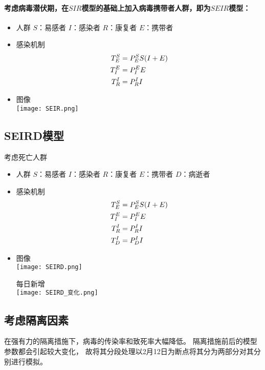 \paragraph{考虑病毒潜伏期，在$SIR$模型的基础上加入病毒携带者人群，即为$SEIR$模型：}
\begin{itemize}
    \item 人群
          \subitem $S$：易感者
          \subitem $I$：感染者
          \subitem $R$：康复者
          \subitem $E$：携带者
    \item 感染机制
          \subitem
          \begin{align}
              T^{S}_{E}&=P^{S}_{E}S(I+E) \\
              T^{E}_{I}&=P^{E}_{I}E      \\
              T^{I}_{R}&=P^{I}_{R}I
          \end{align}
    \item 图像
          \\
          \texttt{[image: SEIR.png]}
\end{itemize}
\subsection{SEIRD模型}
考虑死亡人群
\begin{itemize}
    \item 人群
          \subitem $S$：易感者
          \subitem $I$：感染者
          \subitem $R$：康复者
          \subitem $E$：携带者
          \subitem $D$：病逝者
    \item 感染机制
          \subitem
          \begin{align}
              T^{S}_{E}&=P^{S}_{E}S(I+E) \\
              T^{E}_{I}&=P^{E}_{I}E      \\
              T^{I}_{R}&=P^{I}_{R}I      \\
              T^{I}_{D}&=P^{I}_{D}I
          \end{align}
    \item 图像
          \\
          \texttt{[image: SEIRD.png]}
          \par
          每日新增
          \\
          \texttt{[image: SEIRD\_变化.png]}
\end{itemize}
\subsection{考虑隔离因素}
\par
在强有力的隔离措施下，病毒的传染率和致死率大幅降低。
隔离措施前后的模型参数都会引起较大变化，
故将其分段处理以2月12日为断点将其分为两部分对其分别进行模拟。
